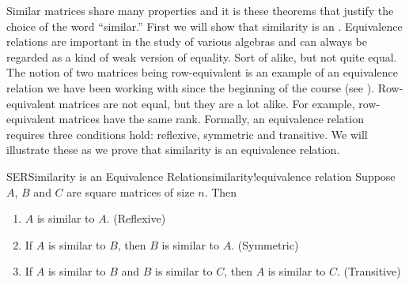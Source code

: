 %
%
Similar matrices share many properties and it is these theorems that justify the choice of the word ``similar.''  First we will show that similarity is an .  Equivalence relations are important in the study of various algebras and can always be regarded as a kind of weak version of equality.  Sort of alike, but not quite equal.  The notion of two matrices being row-equivalent is an example of an equivalence relation we have been working with since the beginning of the course (see ).  Row-equivalent matrices are not equal, but they are a lot alike.  For example, row-equivalent matrices have the same rank.  Formally, an equivalence relation requires three conditions hold:  reflexive, symmetric and transitive.  We will illustrate these as we prove that similarity is an equivalence relation.
%
\begin{theorem}{SER}{Similarity is an Equivalence Relation}{similarity!equivalence relation}
Suppose $A$, $B$ and $C$ are square matrices of size $n$.  Then
%
\begin{enumerate}
\item $A$ is similar to $A$.  (Reflexive)
\item If $A$ is similar to $B$, then $B$ is similar to $A$.  (Symmetric)
\item If $A$ is similar to $B$ and $B$ is similar to $C$, then $A$ is similar to $C$.  (Transitive)
\end{enumerate}
%
\end{theorem}
%
